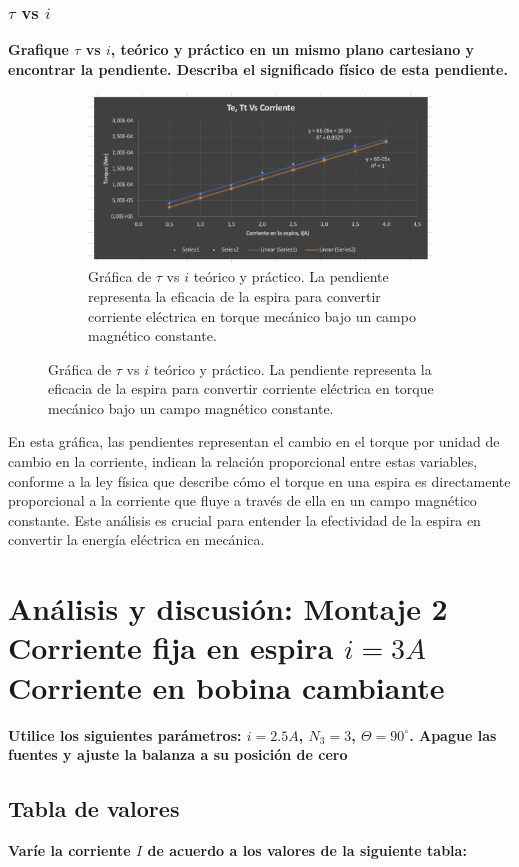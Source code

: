 \subsubsection{$\tau$ vs $i$}
\textbf{Grafique $\tau$ vs $i$, teórico y práctico en un mismo plano cartesiano y
encontrar la pendiente. Describa el significado físico de esta pendiente.}

\begin{figure}[H]
  \centering
  \begin{subfigure}[b]{\textwidth}
      \centering
      \includegraphics[width=\textwidth]{Figures/1. Content/grafica1.png}
      \caption{Gráfica de $\tau$ vs $i$ teórico y práctico. La pendiente representa la eficacia de la espira para convertir corriente eléctrica en torque mecánico bajo un campo magnético constante.}
      \label{fig: Grafica 1}
  \end{subfigure}
  \hfill
\end{figure}

En esta gráfica, las pendientes representan el cambio en el torque por unidad de cambio en la corriente, indican la relación proporcional entre estas variables, conforme a la ley física que describe cómo el torque en una espira es directamente proporcional a la corriente que fluye a través de ella en un campo magnético constante. Este análisis es crucial para entender la efectividad de la espira en convertir la energía eléctrica en mecánica.

\section{Análisis y discusión: Montaje 2 Corriente fija en espira $i = 3A$ Corriente en bobina cambiante}
\textbf{Utilice los siguientes parámetros: $i = 2.5A$, $N_3 = 3$, $\Theta = 90^{\circ}$. Apague las fuentes y
ajuste la balanza a su posición de cero}
\subsection{Tabla de valores}
\textbf{Varíe la corriente $I$ de acuerdo a los valores de la siguiente tabla:}

